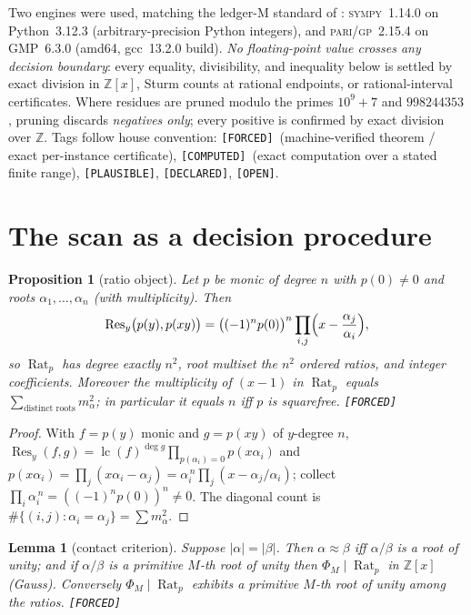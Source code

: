 \documentclass[11pt]{article}
\newcommand{\F}{\textnormal{\texttt{[FORCED]}}}
\newcommand{\C}{\textnormal{\texttt{[COMPUTED]}}}
\newcommand{\Pl}{\textnormal{\texttt{[PLAUSIBLE]}}}
\newcommand{\Dc}{\textnormal{\texttt{[DECLARED]}}}
\newcommand{\Op}{\textnormal{\texttt{[OPEN]}}}
\newcommand{\Z}{\mathbb{Z}}
\newcommand{\Rat}{\operatorname{Rat}}
\newcommand{\Res}{\operatorname{Res}}
\newcommand{\lc}{\operatorname{lc}}
\newcommand{\gp}{\textsc{pari/gp}}
\newcommand{\sy}{\textsc{sympy}}
\newtheorem{lemma}[theorem]{Lemma}
\newtheorem{proposition}[theorem]{Proposition}
\theoremstyle{definition}
\begin{document}
Two engines were used, matching the ledger-M standard of \cite{relcharge}:
\sy~1.14.0 on Python~3.12.3 (arbitrary-precision Python integers), and
\gp~2.15.4 on GMP~6.3.0 (amd64, gcc~13.2.0 build). \emph{No floating-point value
crosses any decision boundary}: every equality, divisibility, and inequality
below is settled by exact division in $\Z[x]$, Sturm counts at rational
endpoints, or rational-interval certificates. Where residues are pruned modulo
the primes $10^9{+}7$ and $998244353$, pruning discards \emph{negatives only};
every positive is confirmed by exact division over $\Z$. Tags follow house
convention: \F\ (machine-verified theorem / exact per-instance certificate),
\C\ (exact computation over a stated finite range), \Pl, \Dc, \Op.

\section{The scan as a decision procedure}\label{sec:scan}

\begin{proposition}[ratio object]\label{prop:rat}
Let $p$ be monic of degree $n$ with $p(0)\neq0$ and roots $\alpha_1,\dots,\alpha_n$
(with multiplicity). Then
\[
\Res_y\bigl(p(y),p(xy)\bigr)
=\bigl((-1)^n p(0)\bigr)^{n}\prod_{i,j}\Bigl(x-\frac{\alpha_j}{\alpha_i}\Bigr),
\]
so $\Rat_p$ has degree exactly $n^2$, root multiset the $n^2$ ordered ratios,
and integer coefficients. Moreover the multiplicity of $(x-1)$ in $\Rat_p$
equals $\sum_{\text{distinct roots}}m_\alpha^{2}$; in particular it equals $n$
iff $p$ is squarefree. \F
\end{proposition}

\begin{proof}
With $f=p(y)$ monic and $g=p(xy)$ of $y$-degree $n$,
$\Res_y(f,g)=\lc(f)^{\deg g}\prod_{p(\alpha_i)=0}p(x\alpha_i)$ and
$p(x\alpha_i)=\prod_j(x\alpha_i-\alpha_j)=\alpha_i^{\,n}\prod_j(x-\alpha_j/\alpha_i)$;
collect $\prod_i\alpha_i^{\,n}=((-1)^np(0))^n\neq0$. The diagonal count is
$\#\{(i,j):\alpha_i=\alpha_j\}=\sum m_\alpha^2$.
\end{proof}

\begin{lemma}[contact criterion]\label{lem:contact}
Suppose $|\alpha|=|\beta|$. Then $\alpha\approx\beta$ iff $\alpha/\beta$ is a
root of unity; and if $\alpha/\beta$ is a primitive $M$-th root of unity then
$\Phi_M\mid\Rat_p$ in $\Z[x]$ (Gauss). Conversely $\Phi_M\mid\Rat_p$ exhibits a
primitive $M$-th root of unity among the ratios. \F
\end{lemma}
\end{document}
